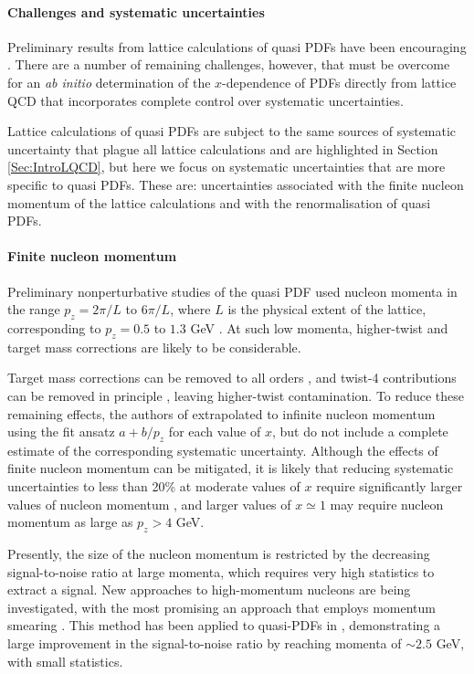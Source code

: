 \paragraph*{Challenges and systematic uncertainties} Preliminary results from lattice calculations of quasi PDFs have been encouraging \cite{Lin:2014zya,Alexandrou:2015rja,Chen:2016utp,Alexandrou:2016jqi}. There are a number of remaining challenges, however, that must be overcome for an {\it ab initio} determination of the $x$-dependence of PDFs directly from lattice QCD that incorporates complete control over systematic uncertainties.

Lattice calculations of quasi PDFs are subject to the same sources of systematic uncertainty that plague all lattice calculations and are highlighted in Section \ref{Sec:IntroLQCD}, but here we focus on systematic uncertainties that are more specific to quasi PDFs. These are: uncertainties associated with the finite nucleon momentum of the lattice calculations and with the renormalisation of quasi PDFs.

\paragraph*{Finite nucleon momentum} Preliminary nonperturbative studies of the quasi PDF used nucleon momenta in the range $p_z = 2\pi/L$ to $6\pi/L$, where $L$ is the physical extent of the lattice, corresponding to $p_z = 0.5$ to $1.3$ GeV  \cite{Lin:2014zya,Alexandrou:2015rja,Chen:2016utp}. At such low momenta, higher-twist and target mass corrections are likely to be considerable.

Target mass corrections can be removed to all orders \cite{Chen:2016utp}, and twist-4 contributions can be removed in principle \cite{Radyushkin:2016hsy,Chen:2016utp}, leaving higher-twist contamination. To reduce these remaining effects, the authors of \cite{Lin:2014zya,Chen:2016utp} extrapolated to infinite nucleon momentum using the fit ansatz $a + b/p_z$ for each value of $x$, but do not include a complete estimate of the corresponding systematic uncertainty. Although the effects of finite nucleon momentum can be mitigated, it is likely that reducing systematic uncertainties to less than 20\% at moderate values of $x$ require significantly larger values of nucleon momentum \cite{Gamberg:2014zwa}, and larger values of $x\simeq 1$ may require nucleon momentum as large as $p_z > 4$ GeV.

Presently, the size of the nucleon momentum is restricted by the decreasing signal-to-noise ratio at large momenta, which requires very high statistics to extract a signal. New approaches to high-momentum nucleons are being investigated, with the most promising an approach that employs momentum smearing \cite{Bali:2016lva}. This method has been applied to quasi-PDFs in \cite{Alexandrou:2016jqi}, demonstrating a large improvement in the signal-to-noise ratio by reaching momenta of $\sim 2.5$ GeV, with small statistics.


